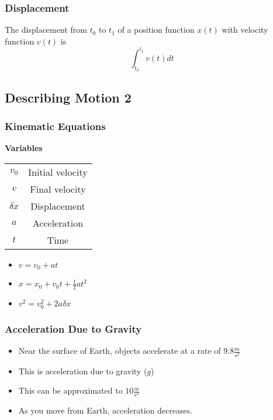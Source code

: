 \documentclass[12pt]{article}
\theoremstyle{break}
\numberwithin{theorem}{subsection}
\numberwithin{lemma}{subsection}
\numberwithin{corollary}{subsection}
\numberwithin{equation}{subsection}
\begin{document}
\subsubsection{Displacement}
The displacement from $t_0$ to $t_1$ of a position function $x(t)$ with velocity function $v(t)$ is
\begin{equation*} 
\int_{t_0}^{t_1} v(t)dt
\end{equation*} 

\newpage
\subsection{Describing Motion 2}

\subsubsection{Kinematic Equations}
\begin{center}
\textbf{Variables}\\
\begin{tabular}{|c|c|}
\hline 
$v_0$ & Initial velocity \\
$v$ & Final velocity \\
$\delta x$ & Displacement \\
$a$ & Acceleration \\
$t$ & Time \\
\hline
\end{tabular}
\end{center}
\begin{itemize}
	\item $v = v_0 + at$
	\item $x = x_0 + v_0 t + \frac12 at^2$
	\item $v^2 = v_0^2 + 2a\delta x$
\end{itemize}

\subsubsection{Acceleration Due to Gravity}
\begin{itemize}
	\item Near the surface of Earth, objects accelerate at a rate of $9.8 \frac m{s^2}$
	\item This is acceleration due to gravity ($g$)
	\item This can be approximated to $10 \frac m{s^2}$
	\item As you move from Earth, acceleration decreases.
\end{itemize}
\end{document}
